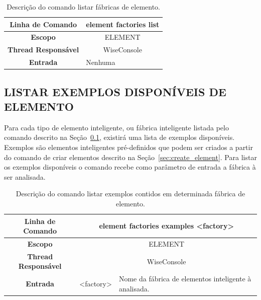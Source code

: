 \documentclass[a4paper,12pt]{monografia}
\theoremstyle{plain}
\theoremstyle{definition}
\theoremstyle{remark}
\begin{document}
\begin{center}
	\begin{table}[!htbp]
		\begin{tabular}{|c|m{}|}
			\hline
			\textbf{Linha de Comando} & \multicolumn{1}{c|}{element factories list} \\
			\hline
			\textbf{Escopo} & \multicolumn{1}{c|}{ELEMENT} \\
			\hline
			\textbf{Thread Responsável} & \multicolumn{1}{c|}{WiseConsole} \\
			\hline
			\textbf{Entrada} & Nenhuma \\
			\hline
		\end{tabular}
		\caption{Descrição do comando listar fábricas de elemento.}
		\label{tab:list_element_factories}
	\end{table}
\end{center}

\subsection{LISTAR EXEMPLOS DISPONÍVEIS DE ELEMENTO}\label{sec:list_example_element_factories}

Para cada tipo de elemento inteligente, ou fábrica inteligente listada pelo comando descrito na Seção~\ref{sec:list_example_element_factories}, existirá uma lista de exemplos disponíveis. Exemplos são elementos inteligentes pré-definidos que podem ser criados a partir do comando de criar elementos descrito na Seção~\ref{sec:create_element}. Para listar os exemplos disponíveis o comando recebe como parâmetro de entrada a fábrica à ser analisada.

\begin{center}
	\begin{table}[!htbp]
		\begin{tabular}{|c|c|m{}|}
			\hline
			\textbf{Linha de Comando} & \multicolumn{2}{c|}{element factories examples <factory>} \\
			\hline
			\textbf{Escopo} & \multicolumn{2}{c|}{ELEMENT} \\
			\hline
			\textbf{Thread Responsável} & \multicolumn{2}{c|}{WiseConsole} \\
			\hline
			\textbf{Entrada} & <factory> & Nome da fábrica de elementos inteligente à analisada. \\
			\hline
		\end{tabular}
		\caption{Descrição do comando listar exemplos contidos em determinada fábrica de elemento.}
		\label{tab:list_element_ex_factories}
	\end{table}
\end{center}
\end{document}
